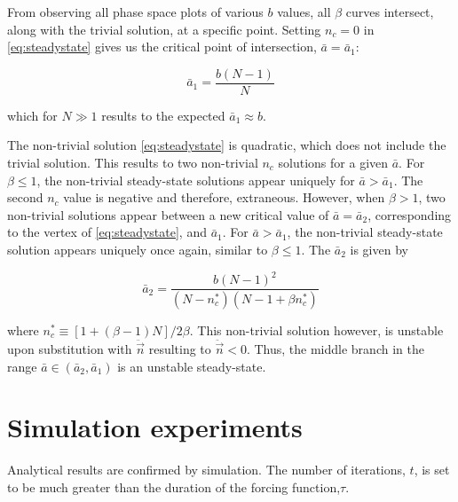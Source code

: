 From observing all phase space plots of various $b$ values, all $\beta$ curves intersect, along with the trivial solution, at a specific point.
Setting $n_{c} = 0$ in \eqref{eq:steadystate} gives us the critical point of intersection, $\bar{a} = \bar{a}_{1}$:

\begin{equation}
\bar{a}_{1} = \frac{b(N-1)}{N}
\end{equation}

which for $N\gg1$ results to the expected $\bar{a}_{1}\approx b$.

The non-trivial solution \eqref{eq:steadystate} is quadratic, which does not include the trivial solution.
This results to two non-trivial $n_{c}$ solutions for a given $\bar{a}$.
For $\beta\leq1$, the non-trivial steady-state solutions appear uniquely for $\bar{a}>\bar{a}_{1}$.
The second $n_{c}$ value is negative and therefore, extraneous.
However, when $\beta>1$, two non-trivial solutions appear between a new critical value of $\bar{a}=\bar{a}_{2}$, corresponding to the vertex of \eqref{eq:steadystate}, and $\bar{a}_{1}$.
For $\bar{a}>\bar{a}_{1}$, the non-trivial steady-state solution appears uniquely once again, similar to $\beta\leq1$.
The $\bar{a}_{2}$ is given by

\begin{equation}
\bar{a}_{2} = \frac{b(N-1)^{2}}{(N-n_{c}^{*})(N-1+\beta n_{c}^{*})}
\end{equation}

where $n_{c}^{*} \equiv [1+(\beta-1)N]/2\beta$.
This non-trivial solution however, is unstable upon substitution with $\ddot{\vec{n}}$ resulting to $\ddot{\vec{n}}<0$.
Thus, the middle branch in the range $\bar{a}\in(\bar{a}_{2},\bar{a}_{1})$ is an unstable steady-state.
 
\section{Simulation experiments}
\hspace{\parindent} Analytical results are confirmed by simulation. The number of iterations, $t$, is set to be much greater than the duration of the forcing function,$\tau$.

